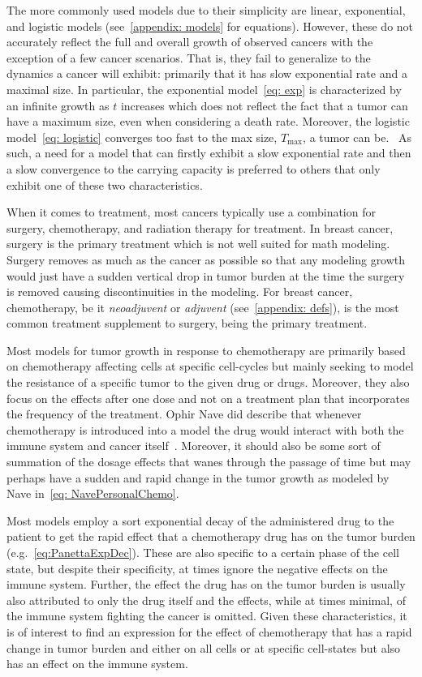 \documentclass[11pt]{amsart}
\begin{document}
The more commonly used models due to their simplicity are linear, exponential, and logistic models (see\ \ref{appendix: models} for equations).
However, these do not accurately reflect the full and overall growth of observed cancers with the exception of a few cancer scenarios.
That is, they fail to generalize to the dynamics a cancer will exhibit: primarily that it has slow exponential rate and a maximal size.
In particular, the exponential model\ \eqref{eq: exp} is characterized by an infinite growth as $t$ increases which does not reflect the fact that a tumor can have a maximum size, even when considering a death rate.
Moreover, the logistic model\ \eqref{eq: logistic} converges too fast to the max size, $T_{\max}$, a tumor can be.\ \cite{Steb23}
As such, a need for a model that can firstly exhibit a slow exponential rate and then a slow convergence to the carrying capacity is preferred to others that only exhibit one of these two characteristics.

When it comes to treatment, most cancers typically use a combination for surgery, chemotherapy, and radiation therapy for treatment.
In breast cancer, surgery is the primary treatment which is not well suited for math modeling. 
Surgery removes as much as the cancer as possible so that any modeling growth would just have a sudden vertical drop in tumor burden at the time the surgery is removed causing discontinuities in the modeling.
For breast cancer, chemotherapy, be it \textit{neoadjuvent} or \textit{adjuvent} (see\ \ref{appendix: defs}), is the most common treatment supplement to surgery, being the primary treatment.

Most models for tumor growth in response to chemotherapy are primarily based on chemotherapy affecting cells at specific cell-cycles but mainly seeking to model the resistance of a specific tumor to the given drug or drugs.
Moreover, they also focus on the effects after one dose and not on a treatment plan that incorporates the frequency of the treatment.
Ophir Nave did describe that whenever chemotherapy is introduced into a model the drug would interact with both the immune system and cancer itself\ \cite{NAVE2022e09288}.
Moreover, it should also be some sort of summation of the dosage effects that wanes through the passage of time but may perhaps have a sudden and rapid change in the tumor growth as modeled by Nave in\ \eqref{eq: NavePersonalChemo}.

Most models employ a sort exponential decay of the administered drug to the patient to get the rapid effect that a chemotherapy drug has on the tumor burden (e.g.\ \eqref{eq:PanettaExpDec}).
These are also specific to a certain phase of the cell state, but despite their specificity, at times ignore the negative effects on the immune system.
Further, the effect the drug has on the tumor burden is usually also attributed to only the drug itself and the effects, while at times minimal, of the immune system fighting the cancer is omitted.
Given these characteristics, it is of interest to find an expression for the effect of chemotherapy that has a rapid change in tumor burden and either on all cells or at specific cell-states but also has an effect on the immune system.
\end{document}
